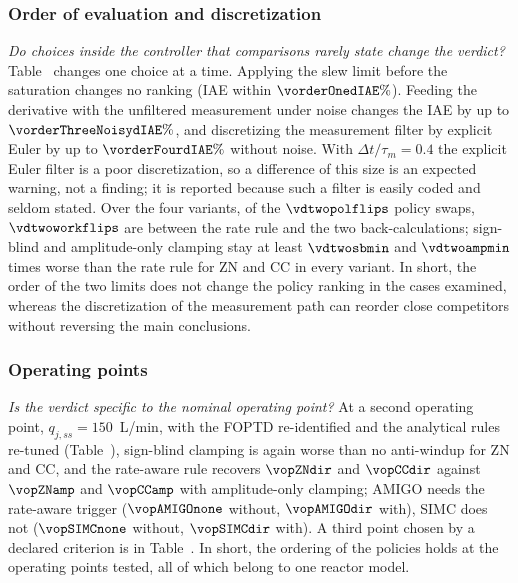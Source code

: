 \subsubsection{Order of evaluation and discretization}
\label{subsubsec:order}
\emph{Do choices inside the controller that comparisons rarely state change the verdict?} Table~ changes one choice at a time. Applying the slew limit before the saturation changes no ranking (IAE within $\vorderOnedIAE\%$). Feeding the derivative with the unfiltered measurement under noise changes the IAE by up to $\vorderThreeNoisydIAE\%$, and discretizing the measurement filter by explicit Euler by up to $\vorderFourdIAE\%$ without noise. With $\Delta t/\tau_m = 0.4$ the explicit Euler filter is a poor discretization, so a difference of this size is an expected warning, not a finding; it is reported because such a filter is easily coded and seldom stated. Over the four variants, of the $\vdtwopolflips$ policy swaps, $\vdtwoworkflips$ are between the rate rule and the two back-calculations; sign-blind and amplitude-only clamping stay at least $\vdtwosbmin$ and $\vdtwoampmin$ times worse than the rate rule for ZN and CC in every variant. In short, the order of the two limits does not change the policy ranking in the cases examined, whereas the discretization of the measurement path can reorder close competitors without reversing the main conclusions.

\subsubsection{Operating points}
\label{subsubsec:op_points}
\emph{Is the verdict specific to the nominal operating point?} At a second operating point, $q_{j,ss} = 150$~L/min, with the FOPTD re-identified and the analytical rules re-tuned (Table~), sign-blind clamping is again worse than no anti-windup for ZN and CC, and the rate-aware rule recovers $\vopZNdir$ and $\vopCCdir$ against $\vopZNamp$ and $\vopCCamp$ with amplitude-only clamping; AMIGO needs the rate-aware trigger ($\vopAMIGOnone$ without, $\vopAMIGOdir$ with), SIMC does not ($\vopSIMCnone$ without, $\vopSIMCdir$ with). A third point chosen by a declared criterion is in Table~. In short, the ordering of the policies holds at the operating points tested, all of which belong to one reactor model.



